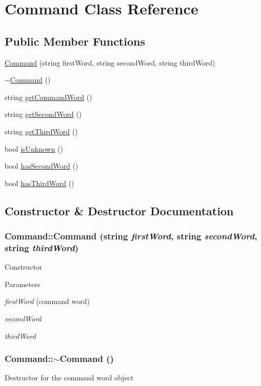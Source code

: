 \hypertarget{classCommand}{
\section{Command Class Reference}
\label{d9/d71/classCommand}
}
\subsection*{Public Member Functions}
\begin{DoxyCompactItemize}
\item 
\hyperlink{classCommand_a42ecf6585cb454ebb1c7422993c636b3}{Command} (string firstWord, string secondWord, string thirdWord)
\item 
\hyperlink{classCommand_ab552bb3a07fdd1acbfd8ea76e69b2278}{$\sim$Command} ()
\item 
string \hyperlink{classCommand_a03a9986a1e2adc85ef1aaf02a3387216}{getCommandWord} ()
\item 
string \hyperlink{classCommand_a977ac7e151122d5174d74f8663725ea0}{getSecondWord} ()
\item 
string \hyperlink{classCommand_adb921b62cb34feb6dd522e7b9c4f23dd}{getThirdWord} ()
\item 
bool \hyperlink{classCommand_a15fba440e0eb3df75bea367448f52a1a}{isUnknown} ()
\item 
bool \hyperlink{classCommand_a6a71c6f60df54f00671fd993a267d6fc}{hasSecondWord} ()
\item 
bool \hyperlink{classCommand_a6c94c33f7e5fae0a4ce604bf998603e6}{hasThirdWord} ()
\end{DoxyCompactItemize}


\subsection{Constructor \& Destructor Documentation}
\hypertarget{classCommand_a42ecf6585cb454ebb1c7422993c636b3}{
\subsubsection[{Command}]{\setlength{\rightskip}{0pt plus 5cm}Command::Command (string {\em firstWord}, \/  string {\em secondWord}, \/  string {\em thirdWord})}}
\label{d9/d71/classCommand_a42ecf6585cb454ebb1c7422993c636b3}
Constructor 
\begin{DoxyParams}{Parameters}
\item[{\em firstWord}](command word) \item[{\em secondWord}]\item[{\em thirdWord}]\end{DoxyParams}
\hypertarget{classCommand_ab552bb3a07fdd1acbfd8ea76e69b2278}{
\subsubsection[{$\sim$Command}]{\setlength{\rightskip}{0pt plus 5cm}Command::$\sim$Command ()}}
\label{d9/d71/classCommand_ab552bb3a07fdd1acbfd8ea76e69b2278}
Destructor for the command word object 

